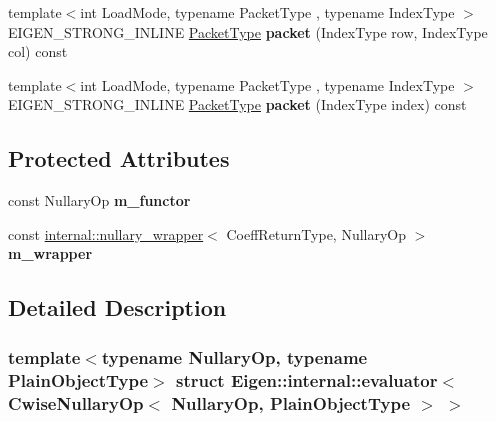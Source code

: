 \begin{DoxyCompactItemize}
{\footnotesize template$<$int Load\+Mode, typename Packet\+Type , typename Index\+Type $>$ }\\E\+I\+G\+E\+N\+\_\+\+S\+T\+R\+O\+N\+G\+\_\+\+I\+N\+L\+I\+NE \hyperlink{struct_eigen_1_1_packet_type}{Packet\+Type} {\bfseries packet} (Index\+Type row, Index\+Type col) const
\item 
\mbox{\label{struct_eigen_1_1internal_1_1evaluator_3_01_cwise_nullary_op_3_01_nullary_op_00_01_plain_object_type_01_4_01_4_a8d21e39c3aee922604f373684dc8efde}} 
{\footnotesize template$<$int Load\+Mode, typename Packet\+Type , typename Index\+Type $>$ }\\E\+I\+G\+E\+N\+\_\+\+S\+T\+R\+O\+N\+G\+\_\+\+I\+N\+L\+I\+NE \hyperlink{struct_eigen_1_1_packet_type}{Packet\+Type} {\bfseries packet} (Index\+Type index) const
\end{DoxyCompactItemize}
\subsection*{Protected Attributes}
\begin{DoxyCompactItemize}
\item 
\mbox{\label{struct_eigen_1_1internal_1_1evaluator_3_01_cwise_nullary_op_3_01_nullary_op_00_01_plain_object_type_01_4_01_4_aa9f23a85180c147ab81089f0ed5d5c66}} 
const Nullary\+Op {\bfseries m\+\_\+functor}
\item 
\mbox{\label{struct_eigen_1_1internal_1_1evaluator_3_01_cwise_nullary_op_3_01_nullary_op_00_01_plain_object_type_01_4_01_4_abe14a722047938709248bc6ec33e6266}} 
const \hyperlink{struct_eigen_1_1internal_1_1nullary__wrapper}{internal\+::nullary\+\_\+wrapper}$<$ Coeff\+Return\+Type, Nullary\+Op $>$ {\bfseries m\+\_\+wrapper}
\end{DoxyCompactItemize}


\subsection{Detailed Description}
\subsubsection*{template$<$typename Nullary\+Op, typename Plain\+Object\+Type$>$\newline
struct Eigen\+::internal\+::evaluator$<$ Cwise\+Nullary\+Op$<$ Nullary\+Op, Plain\+Object\+Type $>$ $>$}



